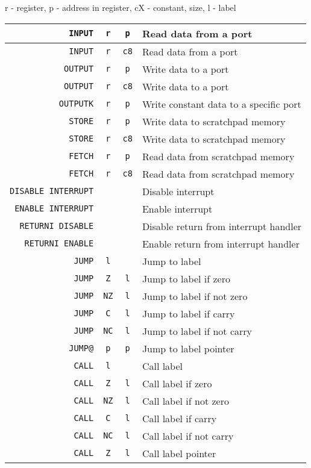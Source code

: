 \begin{table}[H]
\centering
r - register, p - address in register, cX - constant, size, l - label
\begin{tabular}{| r | c | c | l |}\hline
\verb|INPUT|&\verb|r|&\verb|p|& Read data from a port \\ \hline
\verb|INPUT|&\verb|r|&\verb|c8|& Read data from a port \\ \hline
\verb|OUTPUT|&\verb|r|&\verb|p|& Write data to a port \\ \hline
\verb|OUTPUT|&\verb|r|&\verb|c8|& Write data to a port \\ \hline
\verb|OUTPUTK|&\verb|r|&\verb|p|& Write constant data to a specific port\\ \hline

\verb|STORE|&\verb|r|&\verb|p|& Write data to scratchpad memory \\ \hline
\verb|STORE|&\verb|r|&\verb|c8|& Write data to scratchpad memory \\ \hline
\verb|FETCH|&\verb|r|&\verb|p|& Read data from scratchpad memory \\ \hline
\verb|FETCH|&\verb|r|&\verb|c8|& Read data from scratchpad memory \\ \hline

\verb|DISABLE INTERRUPT|&\verb||&\verb||& Disable interrupt \\ \hline
\verb|ENABLE INTERRUPT|&\verb||&\verb||& Enable interrupt \\ \hline
\verb|RETURNI DISABLE|&\verb||&\verb||& Disable return from interrupt handler \\ \hline
\verb|RETURNI ENABLE|&\verb||&\verb||& Enable return from interrupt handler \\ \hline

\verb|JUMP|&\verb|l|&\verb||& Jump to label \\ \hline
\verb|JUMP|&\verb|Z|&\verb|l|& Jump to label if zero \\ \hline
\verb|JUMP|&\verb|NZ|&\verb|l|& Jump to label if not zero \\ \hline
\verb|JUMP|&\verb|C|&\verb|l|& Jump to label if carry \\ \hline
\verb|JUMP|&\verb|NC|&\verb|l|& Jump to label if not carry \\ \hline
\verb|JUMP@|&\verb|p|&\verb|p|& Jump to label pointer\\ \hline

\verb|CALL|&\verb|l|&\verb||& Call label \\ \hline
\verb|CALL|&\verb|Z|&\verb|l|& Call label if zero \\ \hline
\verb|CALL|&\verb|NZ|&\verb|l|& Call label if not zero \\ \hline
\verb|CALL|&\verb|C|&\verb|l|& Call label if carry \\ \hline
\verb|CALL|&\verb|NC|&\verb|l|& Call label if not carry \\ \hline
\verb|CALL|&\verb|Z|&\verb|l|& Call label pointer \\ \hline


\end{tabular}
\end{table}

